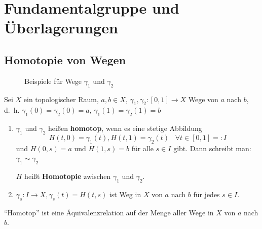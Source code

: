\chapter{Fundamentalgruppe und Überlagerungen}
\section{Homotopie von Wegen}
\begin{figure}[ht]
    \centering
    \hspace{1em}%
    \label{Formen}
    \caption{Beispiele für Wege $\gamma_1$ und $\gamma_2$}
\end{figure}

\begin{definition}
    Sei $X$ ein topologischer Raum, $a, b \in X$, 
    $\gamma_1, \gamma_2: [0,1] \rightarrow X$ Wege von $a$ nach $b$,
    d.~h. $\gamma_1(0) = \gamma_2(0) = a$, $\gamma_1(1) = \gamma_2(1) = b$

    \begin{enumerate}[label=\alph*)]
        \item $\gamma_1$ und $\gamma_2$ heißen \textbf{homotop},
              wenn es eine stetige Abbildung
              \[H(t,0) = \gamma_1(t), H(t,1) = \gamma_2(t) \;\;\; \forall t \in [0,1] =: I \]
              und $H(0,s) = a$ und $H(1,s) = b$ für alle $s \in I$ gibt.
              Dann schreibt man: $\gamma_1 \sim \gamma_2$

              $H$ heißt \textbf{Homotopie} zwischen
              $\gamma_1$ und $\gamma_2$.
        \item $\gamma_s: I \rightarrow X, \gamma_s(t) = H(t,s)$ ist
              Weg in $X$ von $a$ nach $b$ für jedes $s \in I$.
    \end{enumerate}
\end{definition}

\begin{korollar}
    \enquote{Homotop} ist eine Äquivalenzrelation auf der Menge aller
    Wege in $X$ von $a$ nach $b$.
\end{korollar}

